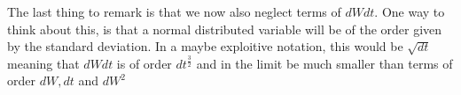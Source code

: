 The last thing to remark is that we now also neglect terms of $dWdt$. One way to think about this, is that a normal distributed variable will be of the order given by the standard deviation. In a maybe exploitive notation, this would be $\sqrt{dt}$ meaning that $dWdt$ is of order $dt^\frac32$ and in the limit be much smaller than terms of order $dW, dt$ and $dW^2$








